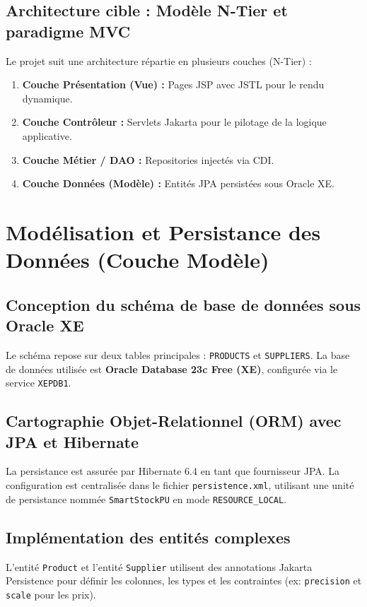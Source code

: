 \documentclass[12pt,a4paper]{report}
\begin{document}
\section{Architecture cible : Modèle N-Tier et paradigme MVC}
Le projet suit une architecture répartie en plusieurs couches (N-Tier) :
\begin{enumerate}
    \item \textbf{Couche Présentation (Vue) :} Pages JSP avec JSTL pour le rendu dynamique.
    \item \textbf{Couche Contrôleur :} Servlets Jakarta pour le pilotage de la logique applicative.
    \item \textbf{Couche Métier / DAO :} Repositories injectés via CDI.
    \item \textbf{Couche Données (Modèle) :} Entités JPA persistées sous Oracle XE.
\end{enumerate}

\chapter{Modélisation et Persistance des Données (Couche Modèle)}

\section{Conception du schéma de base de données sous Oracle XE}
Le schéma repose sur deux tables principales : \texttt{PRODUCTS} et \texttt{SUPPLIERS}. La base de données utilisée est \textbf{Oracle Database 23c Free (XE)}, configurée via le service \texttt{XEPDB1}.

\section{Cartographie Objet-Relationnel (ORM) avec JPA et Hibernate}
La persistance est assurée par Hibernate 6.4 en tant que fournisseur JPA. La configuration est centralisée dans le fichier \texttt{persistence.xml}, utilisant une unité de persistance nommée \texttt{SmartStockPU} en mode \texttt{RESOURCE\_LOCAL}.

\section{Implémentation des entités complexes}
L'entité \texttt{Product} et l'entité \texttt{Supplier} utilisent des annotations Jakarta Persistence pour définir les colonnes, les types et les contraintes (ex: \texttt{precision} et \texttt{scale} pour les prix).
\end{document}
